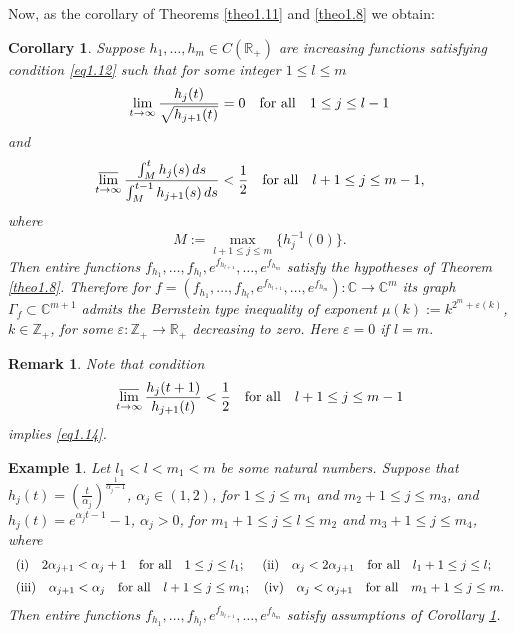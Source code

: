 \documentclass[11pt, oneside]{amsart}
\newtheorem{C}[Th]{Corollary}
\newtheorem{R}[Th]{Remark}
\newtheorem{E}[Th]{Example}
\begin{document}
Now, as the corollary of Theorems \ref{theo1.11} and \ref{theo1.8} we obtain:
\begin{C}\label{cor1.15}
Suppose $h_1,\dots, h_m\in C(\mathbb R_+)$  are increasing functions satisfying condition \eqref{eq1.12}  such that for some integer $1\le l\le m$
\begin{equation}\label{eq1.13}
\lim_{t\rightarrow\infty}\frac{h_{j}(t)}{\sqrt{h_{j+1}(t)}}=0\quad {\rm for\ all}\quad  1\le j\le l-1
\end{equation}
and
\begin{equation}\label{eq1.14}
\varlimsup_{t\rightarrow\infty}\frac{\int_{M}^{t} h_{j}(s)\,ds}{\int_{M}^{t-1} h_{j+1}(s)\,ds}<\frac 12 \quad {\rm for\ all}\quad  l+1\le j\le m-1,
\end{equation}
where 
\[
M:=\max_{l+1\le j\le m}\{h_j^{-1}(0)\}.
\]
Then entire functions $f_{h_1},\dots, f_{h_l}, e^{f_{h_{l+1}}},\dots, e^{f_{h_m}}$ satisfy the hypotheses of Theorem \ref{theo1.8}. Therefore for $f=(f_{h_1},\dots, f_{h_l}, e^{f_{h_{l+1}}},\dots, e^{f_{h_m}}):\mathbb C\rightarrow\mathbb C^{m}$ its graph $\Gamma_f\subset\mathbb C^{m+1}$ admits the Bernstein type inequality of exponent $\mu(k):=k^{2^{m}+\varepsilon(k)}$, $k\in\mathbb Z_+$, for some $\varepsilon :
\mathbb Z_+\rightarrow \mathbb R_+$ decreasing to zero. Here $\varepsilon= 0$ if $l=m$.
\end{C}
\begin{R}\label{rem1.22}
{\rm Note that condition
\[
\varlimsup_{t\rightarrow\infty}\frac{h_{j}(t+1)}{h_{j+1}(t)}<\frac 12 \quad {\rm for\ all}\quad  l+1\le j\le m-1
\]
implies \eqref{eq1.14}.
}
\end{R}
\begin{E}\label{eq1.19}
{\rm Let $l_1<l<m_1<m$ be some natural numbers.
Suppose that $h_j(t)=\left(\frac{t}{\alpha_j}\right)^{\frac{1}{\alpha_j-1}}$, $\alpha_j\in (1,2)$, for $1\le j\le m_1$ and $m_2+1\le j\le m_3$, and $h_j(t)=e^{\alpha_j t-1}-1$, $\alpha_j>0$, for $m_1+1\le j\le l\le m_2$ and $m_3+1\le j\le m_4$, where
\[
\begin{array}{l}
{\rm (i)}\quad 2\alpha_{j+1}<\alpha_j+1\quad {\rm for\ all}\quad 1\le j\le l_1;\quad \ {\rm (ii)}\quad
\alpha_{j}<2\alpha_{j+1}\quad {\rm for\ all}\quad l_1+1\le j\le l;\medskip\\
{\rm (iii)}\quad \alpha_{j+1}<\alpha_j\quad {\rm for\ all}\quad l+1\le j\le m_1; \quad {\rm (iv)}\quad
\alpha_{j}<\alpha_{j+1}\quad {\rm for\ all}\quad m_1+1\le j\le m.
\end{array}
\]
Then entire functions $f_{h_1},\dots, f_{h_{l}}, e^{f_{h_{l+1}}},\dots, e^{f_{h_{m}}}$ satisfy assumptions of Corollary \ref{cor1.15}.
}
\end{E}
\end{document}
